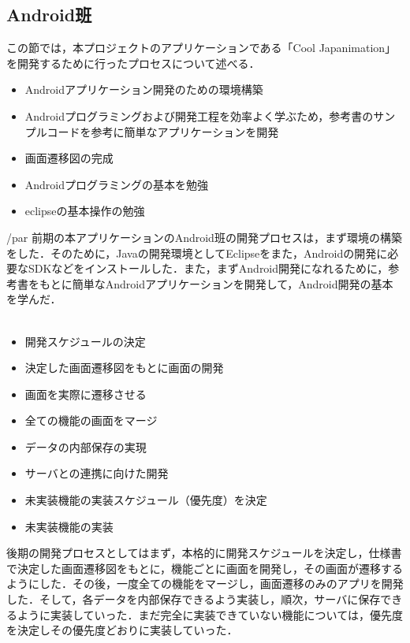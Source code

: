 \subsection{Android班}
\par この節では，本プロジェクトのアプリケーションである「Cool Japanimation」を開発するために行ったプロセスについて述べる．

\begin{itemize}
\item Androidアプリケーション開発のための環境構築
\item Androidプログラミングおよび開発工程を効率よく学ぶため，参考書のサンプルコードを参考に簡単なアプリケーションを開発
\item 画面遷移図の完成
\item Androidプログラミングの基本を勉強
\item eclipseの基本操作の勉強
\end{itemize}

/par
前期の本アプリケーションのAndroid班の開発プロセスは，まず環境の構築をした．そのために，Javaの開発環境としてEclipseをまた，Androidの開発に必要なSDKなどをインストールした．また，まずAndroid開発になれるために，参考書をもとに簡単なAndroidアプリケーションを開発して，Android開発の基本を学んだ．
\\
\\
\begin{itemize}
\item 開発スケジュールの決定
\item 決定した画面遷移図をもとに画面の開発
\item 画面を実際に遷移させる
\item 全ての機能の画面をマージ
\item データの内部保存の実現
\item サーバとの連携に向けた開発
\item 未実装機能の実装スケジュール（優先度）を決定
\item 未実装機能の実装
\end{itemize}

\par
後期の開発プロセスとしてはまず，本格的に開発スケジュールを決定し，仕様書で決定した画面遷移図をもとに，機能ごとに画面を開発し，その画面が遷移するようにした．その後，一度全ての機能をマージし，画面遷移のみのアプリを開発した．そして，各データを内部保存できるよう実装し，順次，サーバに保存できるように実装していった．まだ完全に実装できていない機能については，優先度を決定しその優先度どおりに実装していった．
